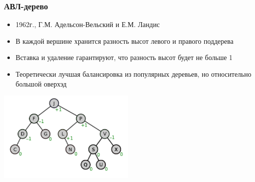 \documentclass[xetex,mathserif,serif]{beamer}
\begin{document}
    \begin{frame}
        \frametitle{АВЛ-дерево}
        \begin{itemize}
            \item 1962г., Г.М. Адельсон-Вельский и Е.М. Ландис
            \item В каждой вершине хранится разность высот левого и правого поддерева
            \item Вставка и удаление гарантируют, что разность высот будет не больше 1
            \item Теоретически лучшая балансировка из популярных деревьев, но относительно большой оверхэд
        \end{itemize}
        \begin{center}
            \includegraphics[width=0.5\textwidth]{avl-tree.png}
        \end{center}
    \end{frame}
\end{document}
